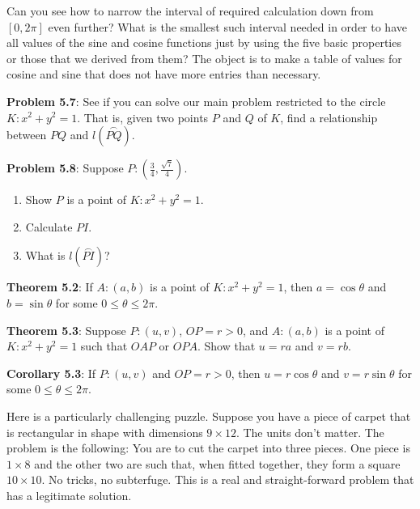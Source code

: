 \documentclass[english]{book}
\newcommand{\arc}[1]{\overset{\frown}{#1} }
\begin{document}
Can you see how to narrow the interval of required calculation down from $[0,2\pi]$ even further? What is the smallest such interval needed in order to have all values of the sine and cosine functions just by using the five basic properties or those that we derived from them? The object is to make a table of values for cosine and sine that does not have more entries than necessary.

\vspace{0.3cm}

\textbf{Problem 5.7}: See if you can solve our main problem restricted to the circle $K:x^{2}+y^{2}=1$. That is, given two points $P$ and $Q$ of $K$, find a relationship between $PQ$ and $l(\arc{PQ})$.

\vspace{0.3cm}

\textbf{Problem 5.8}: Suppose $P:(\frac{3}{4},\frac{\sqrt{7}}{4})$.
\begin{enumerate}[\hspace{1cm}a)]
  \item Show $P$ is a point of $K:x^{2}+y^{2}=1$. 
  \item Calculate $PI$. 
  \item What is $l(\arc{PI})$?
\end{enumerate}

\textbf{Theorem 5.2}: If $A:(a,b)$ is a point of $K:x^{2}+y^{2}=1$, then $a = \cos \theta$ and $b = \sin \theta$ for some $0 \leq \theta \leq 2\pi$.

\vspace{0.3cm}

\textbf{Theorem 5.3}: Suppose $P:(u,v)$, $OP=r>0$, and $A:(a,b)$ is a point of $K:x^{2}+y^{2}=1$ such that $OAP$ or $OPA$. Show that $u=ra$ and $v=rb$.

\vspace{0.3cm}

\textbf{Corollary 5.3}: If $P:(u,v)$ and $OP=r>0$, then $u=r\cos\theta$ and $v = r \sin \theta$ for some $0 \leq \theta \leq 2\pi$.

\vspace{0.3cm}

Here is a particularly challenging puzzle. Suppose you have a piece of carpet that is rectangular in shape with dimensions $9 \times 12$. The units don't matter. The problem is the following: You are to cut the carpet into three pieces. One piece is $1 \times 8$ and the other two are such that, when fitted together, they form a square $10 \times 10$. No tricks, no subterfuge. This is a real and straight-forward problem that has a legitimate solution.
\end{document}
